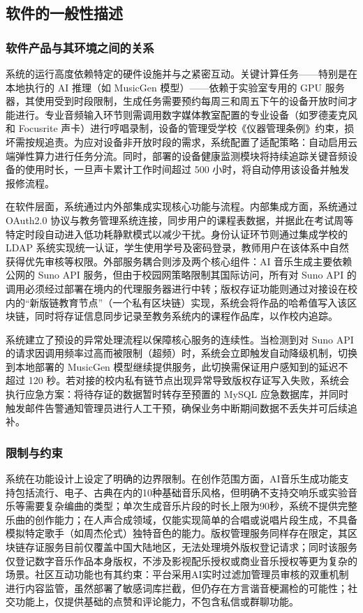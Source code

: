 \documentclass{base}
\begin{document}
\subsection{软件的一般性描述}
\subsubsection{软件产品与其环境之间的关系}

系统的运行高度依赖特定的硬件设施并与之紧密互动。关键计算任务——特别是在本地执行的 AI 推理（如 MusicGen 模型）——依赖于实验室专用的 GPU 服务器，其使用受到时段限制，生成任务需要预约每周三和周五下午的设备开放时间才能进行。专业音频输入环节则需调用数字媒体教室配置的专业设备（如罗德麦克风和 Focusrite 声卡）进行哼唱录制，设备的管理受学校《仪器管理条例》约束，损坏需按规追责。为应对设备非开放时段的需求，系统配置了适配策略：自动启用云端弹性算力进行任务分流。同时，部署的设备健康监测模块将持续追踪关键音频设备的使用时长，一旦声卡累计工作时间超过 500 小时，将自动停用该设备并触发报修流程。

​​在软件层面，系统通过内外部集成实现核心功能与流程。内部集成方面，系统通过 OAuth2.0 协议与教务管理系统连接，同步用户的课程表数据，并据此在考试周等特定时段自动进入低功耗静默模式以减少干扰。身份认证环节则通过集成学校的 LDAP 系统实现统一认证，学生使用学号及密码登录，教师用户在该体系中自然获得优先审核等权限。外部服务耦合则涉及两个核心组件：AI 音乐生成主要依赖公网的 Suno API 服务，但由于校园网策略限制其国际访问，所有对 Suno API 的调用必须经过部署在境内的代理服务器进行中转；版权存证功能则通过对接设在校内的“新版链教育节点”（一个私有区块链）实现，系统会将作品的哈希值写入该区块链，同时将存证信息同步记录至教务系统内的课程作品库，以作校内追踪。

​​系统建立了预设的异常处理流程以保障核心服务的连续性。当检测到对 Suno API 的请求因调用频率过高而被限制（超频）时，系统会立即触发自动降级机制，切换到本地部署的 MusicGen 模型继续提供服务，此切换需保证用户感知到的延迟不超过 120 秒。若对接的校内私有链节点出现异常导致版权存证写入失败，系统会执行应急方案：将待存证的数据暂时转存至预置的 MySQL 应急数据库，并同时触发邮件告警通知管理员进行人工干预，确保业务中断期间数据不丢失并可后续追补。

\subsubsection{限制与约束}

系统在功能设计上设定了明确的边界限制。在创作范围方面，AI音乐生成功能支持包括流行、电子、古典在内的10种基础音乐风格，但明确不支持交响乐或实验音乐等需要复杂编曲的类型；单次生成音乐片段的时长上限为90秒，系统不提供完整乐曲的创作能力；在人声合成领域，仅能实现简单的合唱或说唱片段生成，不具备模拟特定歌手（如周杰伦式）独特音色的能力。版权管理服务同样存在限定，其区块链存证服务目前仅覆盖中国大陆地区，无法处理境外版权登记请求；同时该服务仅登记数字音乐作品本身版权，不涉及影视配乐授权或商业音乐授权等更为复杂的场景。社区互动功能也有其约束：平台采用AI实时过滤加管理员审核的双重机制进行内容监管，虽然部署了敏感词库拦截，但仍存在方言谐音梗漏检的可能性；社交功能上，仅提供基础的点赞和评论能力，不包含私信或群聊功能。
\end{document}
